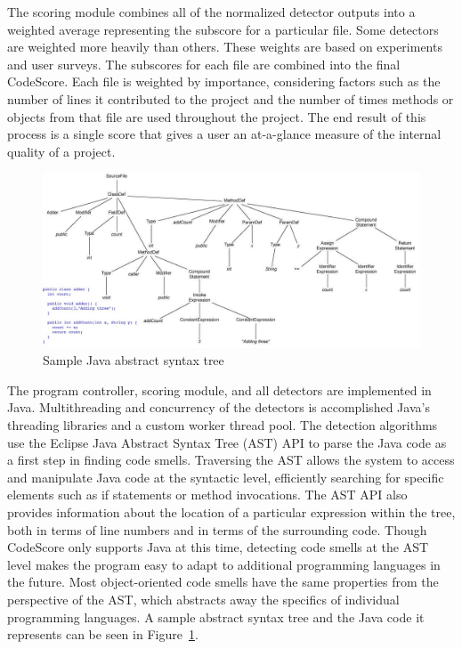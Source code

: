 \documentclass{sig-alternate}
\begin{document}
The scoring module combines all of the normalized detector outputs into a
weighted average representing the subscore for a particular file. Some detectors
are weighted more heavily than others. These weights are based on experiments
and user surveys. The subscores for each file are combined into the final
CodeScore. Each file is weighted by importance, considering factors such as the
number of lines it contributed to the project and the number of times methods or
objects from that file are used throughout the project. The end result of this 
process is a single score that gives a user an at-a-glance measure of the internal quality of a project.

\begin{figure}[ht]
	\begin{center}
		\includegraphics[width=0.9\linewidth]{syntax_tree}
	\end{center}
	\vspace{-12pt}
	\caption{Sample Java abstract syntax tree}
	\label{fig: ast}
\end{figure}

The program controller, scoring module, and all detectors are implemented in
Java. Multithreading and concurrency of the detectors is accomplished Java's threading libraries
and a custom worker thread pool. The detection algorithms use the Eclipse Java Abstract 
Syntax Tree (AST) API to parse the
Java code as a first step in finding code smells. Traversing the AST allows the
system to access and manipulate Java code at the syntactic level, efficiently searching
for specific elements such as if statements or method invocations. The AST API also
provides information about the location of a particular expression within the
tree, both in terms of line numbers and in terms of the surrounding code.  
Though CodeScore only supports Java at this time, detecting code smells at the AST level 
makes the program easy to adapt to additional programming languages in the future.
Most object-oriented code smells have the same properties from the perspective of the AST,
which abstracts away the specifics of individual programming languages. A sample
abstract syntax tree and the Java code it represents can be seen in Figure~\ref{fig: ast}.
\end{document}
